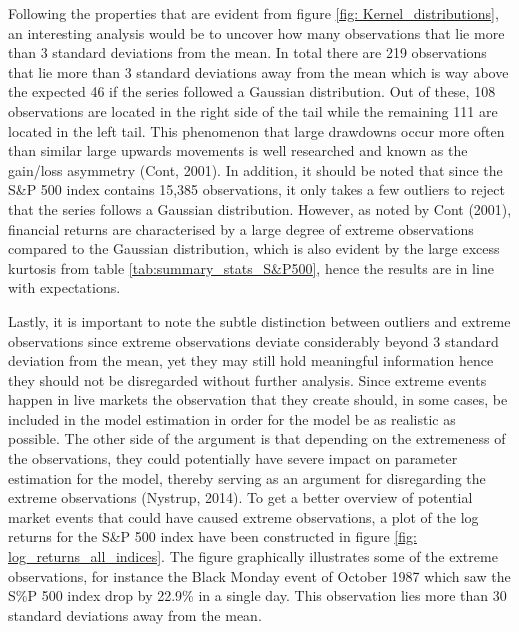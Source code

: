 Following the properties that are evident from figure \ref{fig: Kernel_distributions}, an interesting analysis would be to uncover how many observations that lie more than 3 standard deviations from the mean. In total there are 219 observations that lie more than 3 standard deviations away from the mean which is way above the expected 46 if the series followed a Gaussian distribution. Out of these, 108 observations are located in the right side of the tail while the remaining 111 are located in the left tail. This phenomenon that large drawdowns occur more often than similar large upwards movements is well researched and known as the gain/loss asymmetry (Cont, 2001). In addition, it should be noted that since the S\&P 500 index contains 15,385 observations, it only takes a few outliers to reject that the series follows a Gaussian distribution. However, as noted by Cont (2001), financial returns are characterised by a large degree of extreme observations compared to the Gaussian distribution, which is also evident by the large excess kurtosis from table \ref{tab:summary_stats_S&P500}, hence the results are in line with expectations.

Lastly, it is important to note the subtle distinction between outliers and extreme observations since extreme observations deviate considerably beyond 3 standard deviation from the mean, yet they may still hold meaningful information hence they should not be disregarded without further analysis.
Since extreme events happen in live markets the observation that they create should, in some cases, be included in the model estimation in order for the model be as realistic as possible. The other side of the argument is that depending on the extremeness of the observations, they could potentially have severe impact on parameter estimation for the model, thereby serving as an argument for disregarding the extreme observations (Nystrup, 2014). To get a better overview of potential market events that could have caused extreme observations, a plot of the log returns for the S\&P 500 index have been constructed in figure \ref{fig: log_returns_all_indices}. The figure graphically illustrates some of the extreme observations, for instance the Black Monday event of October 1987 which saw the S\%P 500 index drop by 22.9\% in a single day. This observation lies more than 30 standard deviations away from the mean.

